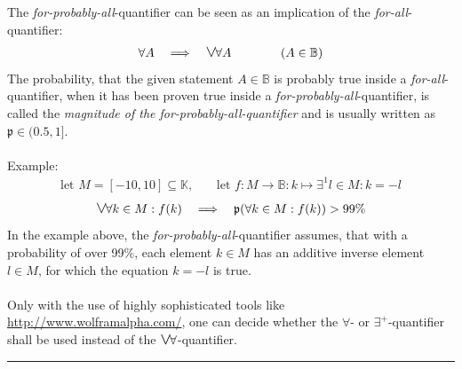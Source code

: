 \documentclass[pdftex,12pt,a4paper]{report}
\newcommand{\fpa}{\hbox{\fontsize{13.3pt}{15pt}\selectfont $ \vee $} \hspace{-1.2pt} \forall}
\begin{document}
    The \emph{for-probably-all}-quantifier can be seen as an implication of the \emph{for-all}-quantifier:
    \begin{equation*}
        \begin{aligned}
            \forall A \quad \Longrightarrow \quad \fpa A \qquad \qquad (A \in \mathbb{B})
        \end{aligned}
    \end{equation*}
    The probability, that the given statement $ A \in \mathbb{B} $ is probably true inside a \emph{for-all}-quantifier, when it has been proven true inside a \emph{for-probably-all}-quantifier, is called the \textit{magnitude of the for-probably-all-quantifier} and is usually written as $ \mathfrak{p} \in (0.5,1] $. \\ \\
    Example:
    \begin{equation*}
        \begin{aligned}
            \text{let } M = [-10, 10] \subseteq \mathbb{K} \text{,} \qquad \text{let } f : M \rightarrow \mathbb{B} : k \mapsto \exists^1 l \in M : k = -l
        \end{aligned}
    \end{equation*}
    \begin{equation*}
        \begin{aligned}
            \fpa k \in M : f(k) \quad \Longrightarrow \quad \mathfrak{p}(\forall k \in M : f(k)) > 99\%
        \end{aligned}
    \end{equation*}
    In the example above, the \emph{for-probably-all}-quantifier assumes, that with a probability of over 99\%, each element $ k \in M $ has an additive inverse element $ l \in M $, for which the equation $ k = -l $ is true.
    \\ \\
    Only with the use of highly sophisticated tools like \url{http://www.wolframalpha.com/}, one can decide whether the $ \forall $- or $ \exists^+ $-quantifier shall be used instead of the $ \fpa $-quantifier.
    \vspace{5mm} \hrule
\end{document}
